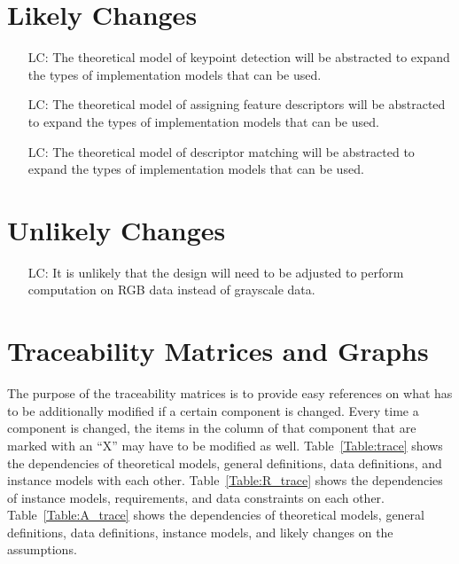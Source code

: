 \documentclass[12pt]{article}
\newcounter{lcnum} %
\begin{document}
\section{Likely Changes}    

\noindent \begin{itemize}

\item[LC\refstepcounter{lcnum}\thelcnum\label{LC_keypoint_method}:] 
The theoretical model of keypoint detection will be abstracted to expand the types of 
implementation models that can be used.

\item[LC\refstepcounter{lcnum}\thelcnum\label{LC_descriptor_method}:] 
The theoretical model of assigning feature descriptors will be abstracted to expand the types of 
implementation models that can be used.

\item[LC\refstepcounter{lcnum}\thelcnum\label{LC_comparison_method}:] 
The theoretical model of descriptor matching will be abstracted to expand the types of 
implementation models that can be used.

\end{itemize}

\section{Unlikely Changes}    

\noindent \begin{itemize}

\item[LC\refstepcounter{lcnum}\thelcnum\label{RGB_Data}:] It is unlikely that the design 
will need to be adjusted to perform computation on RGB data instead of grayscale data.

\end{itemize}

\section{Traceability Matrices and Graphs}

The purpose of the traceability matrices is to provide easy references on what
has to be additionally modified if a certain component is changed.  Every time a
component is changed, the items in the column of that component that are marked
with an ``X'' may have to be modified as well.  Table~\ref{Table:trace} shows the
dependencies of theoretical models, general definitions, data definitions, and
instance models with each other. Table~\ref{Table:R_trace} shows the
dependencies of instance models, requirements, and data constraints on each
other. Table~\ref{Table:A_trace} shows the dependencies of theoretical models,
general definitions, data definitions, instance models, and likely changes on
the assumptions.
\end{document}
